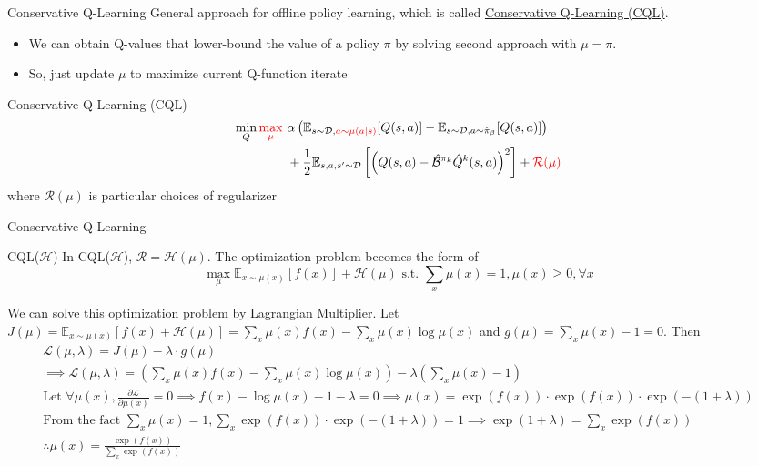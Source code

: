 \documentclass[11pt]{beamer}
\newcommand{\mbb}[1]{\mathbb{#1}}
\newcommand{\mc}[1]{\mathcal{#1}}
\begin{document}
\begin{frame}{Conservative Q-Learning}
  General approach for offline policy learning, which is called \underline{Conservative Q-Learning (CQL)}.
  \begin{itemize}
    \item We can obtain Q-values that lower-bound the value of a policy $\pi$ by solving second approach with $\mu = \pi$.
    \item So, just update $\mu$ to maximize current Q-function iterate
  \end{itemize}
  \begin{block}{Conservative Q-Learning (CQL)}
    \[
    \begin{aligned}
      \min_{Q} \textcolor{red}{\max_{\mu}} \ &\alpha \left( \mbb{E}_{s \sim \mc{D}, \textcolor{red}{a \sim \mu(a|s)}}[Q(s,a)] - \mbb{E}_{s \sim \mc{D}, a \sim \hat{\pi}_\beta} [Q(s,a)] \right) \\
      &+ \frac{1}{2} \mbb{E}_{s,a,s^\prime \sim \mc{D}}\left[\left(Q(s,a) - \hat{\mc{B}}^{\pi_k}\hat{Q}^k (s,a) \right)^2 \right] + \textcolor{red}{\mc{R}(\mu)}
    \end{aligned}
    \]
    where $\mc{R}(\mu)$ is particular choices of regularizer
  \end{block}
\end{frame}

\begin{frame}{Conservative Q-Learning}
  \begin{block}{CQL($\mc{H}$)}
    In CQL($\mc{H}$), $\mc{R} = \mc{H}(\mu)$.
    The optimization problem becomes the form of
    \[
      \max_\mu \mbb{E}_{x \sim \mu(x)}[f(x)] + \mc{H}(\mu) \text{ s.t. }  \sum_x \mu(x)=1,\mu(x) \geq 0, \forall x
    \]

    We can solve this optimization problem by Lagrangian Multiplier.
    Let $J(\mu) = \mbb{E}_{x \sim \mu(x)} [f(x) + \mc{H}(\mu)] = \sum_x \mu(x)f(x) - \sum_x \mu(x) \log \mu(x)$ and $g(\mu) = \sum_x \mu(x) - 1 = 0$.
    Then
    \[
    \begin{gathered}
      \mc{L}(\mu, \lambda) = J(\mu) - \lambda \cdot g(\mu) \\
      \implies \mc{L}(\mu, \lambda) = \left(\sum_x \mu(x) f(x) - \sum_x \mu(x) \log \mu(x)\right) - \lambda \left(\sum_x \mu(x) -1\right) \\
      \text{Let } \forall \mu(x), \frac{\partial \mc{L}}{\partial \mu(x)} = 0 \implies f(x) - \log \mu(x) - 1 - \lambda = 0 \implies \mu(x) = \exp(f(x)) \cdot \exp(f(x)) \cdot \exp(-(1+\lambda)) \\
      \text{From the fact } \sum_x \mu(x)=1, \sum_x \exp(f(x)) \cdot \exp(-(1+\lambda)) =1 \implies \exp(1+\lambda) = \sum_x \exp(f(x)) \\
      \therefore \mu(x) = \frac{\exp(f(x))}{\sum_x \exp(f(x))}
    \end{gathered}
    \]
  \end{block}
\end{frame}
\end{document}
